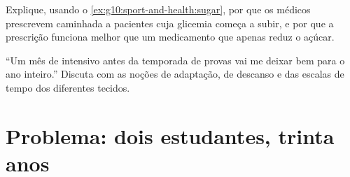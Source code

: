 \begin{exercise}[$\star\star\star$]\label{exo:g10:sport-and-health:14}
Explique, usando o \cref{ex:g10:sport-and-health:sugar}, por que os
médicos prescrevem caminhada a pacientes cuja glicemia começa a subir,
e por que a prescrição funciona melhor que um medicamento que apenas
reduz o açúcar.
\end{exercise}

\begin{exercise}[$\star\star\star$]\label{exo:g10:sport-and-health:15}
``Um mês de  intensivo antes da temporada de provas vai me
deixar bem para o ano inteiro.'' Discuta com as noções de adaptação, de
descanso e das escalas de tempo dos diferentes tecidos.
\end{exercise}

\section{Problema: dois estudantes, trinta anos}

